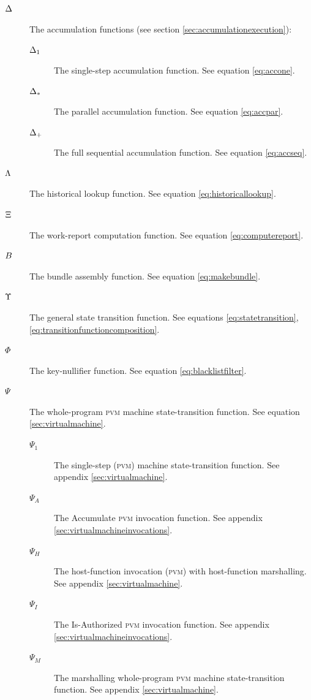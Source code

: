 \begin{description}
  \item[$\Delta$] The accumulation functions (see section \ref{sec:accumulationexecution}):
  \begin{description}
    \item[$\Delta_1$] The single-step accumulation function. See equation \ref{eq:accone}.
    \item[$\Delta_*$] The parallel accumulation function. See equation \ref{eq:accpar}.
    \item[$\Delta_+$] The full sequential accumulation function. See equation \ref{eq:accseq}.
  \end{description}
  \item[$\Lambda$] The historical lookup function. See equation \ref{eq:historicallookup}.
  \item[$\Xi$] The work-report computation function. See equation \ref{eq:computereport}.
  \item[$B$] The bundle assembly function. See equation \ref{eq:makebundle}.
  \item[$\Upsilon$] The general state transition function. See equations \ref{eq:statetransition}, \ref{eq:transitionfunctioncomposition}.
  \item[$\Phi$] The key-nullifier function. See equation \ref{eq:blacklistfilter}.
  \item[$\Psi$] The whole-program \textsc{pvm} machine state-transition function. See equation \ref{sec:virtualmachine}.
  \begin{description}
    \item[$\Psi_1$] The single-step (\textsc{pvm}) machine state-transition function. See appendix \ref{sec:virtualmachine}.
    \item[$\Psi_A$] The Accumulate \textsc{pvm} invocation function. See appendix \ref{sec:virtualmachineinvocations}.
    \item[$\Psi_H$] The host-function invocation (\textsc{pvm}) with host-function marshalling. See appendix \ref{sec:virtualmachine}.
    \item[$\Psi_I$] The Is-Authorized \textsc{pvm} invocation function. See appendix \ref{sec:virtualmachineinvocations}.
    \item[$\Psi_M$] The marshalling whole-program \textsc{pvm} machine state-transition function. See appendix \ref{sec:virtualmachine}.

\end{description}
\end{description}
